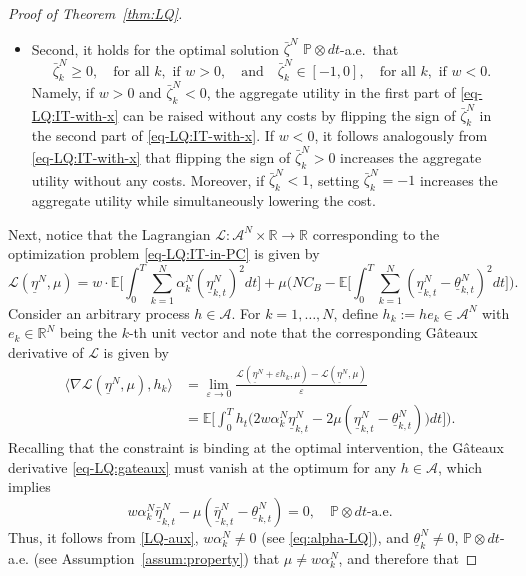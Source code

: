 \documentclass[11pt]{article}
\def\al{\alpha}
\def\P{\mathbb{P}}
\def\E{{\mathbb{E}}}
\newcommand{\R}{{\mathbb R}}
\newcommand{\be}{\begin{equation}}
\newcommand{\ee}{\end{equation}}
\numberwithin{equation}{section}
\begin{document}
\begin{proof}[Proof of Theorem~\ref{thm:LQ}]
\begin{itemize}
\item Second, it holds for the optimal solution $\bar\zeta^N$ $\P \otimes dt$-a.e.~that
\be\label{eq-LQ:optimal-x-constraint}
\bar\zeta^N_{k}\geq 0,\quad  \textrm{for all } k,\textrm{ if }w>0,\quad \textrm{and}\quad \bar\zeta^N_{k}\in [-1,0],\quad  \textrm{for all }k,\textrm{ if }w<0.
\ee
Namely, if $w>0$ and $\bar\zeta^N_k<0$, the aggregate utility in the first part of \eqref{eq-LQ:IT-with-x} can be raised without any costs by flipping the sign of $\bar\zeta^N_k$ in the second part of \eqref{eq-LQ:IT-with-x}. If $w<0$, it follows analogously from \eqref{eq-LQ:IT-with-x} that flipping the sign of $\bar\zeta^N_{k}> 0$ increases the aggregate utility without any costs. Moreover, if $\bar\zeta^N_{k}< 1$, setting $\bar\zeta^N_{k}=-1$ increases the aggregate utility while simultaneously lowering the cost.
\end{itemize}
Next, notice that the Lagrangian $\mathcal{L}:\mathcal{A}^N\times\R\to\R$ corresponding to the optimization problem \eqref{eq-LQ:IT-in-PC} is given by 
$$
\mathcal{L}(\underline{\eta}^N,\mu)=w \cdot\E\bigg[\int_0^T \sum_{k=1}^N\al^N_k(\underline{\eta}_{k,t}^N)^2dt\bigg]
+\mu \bigg(NC_B-\E\bigg[\int_0^T\sum_{k=1}^N ( \underline{\eta}^N_{k,t}-\underline{\theta}^N_{k,t})^2dt\bigg]\bigg).
$$
Consider an arbitrary process $h\in\mathcal{A}$. For $k=1,\ldots,N$, define $h_k:=he_{k}\in\mathcal{A}^N$ with $e_{k}\in\R^N$ being the $k$-th unit vector and note that the corresponding G\^ateaux derivative of $\mathcal{L}$ is given by
\be \begin{aligned}\label{eq-LQ:gateaux}
    \langle  \nabla  \mathcal{L}(\underline{{\eta}}^N,\mu) , h_k  \rangle &= \lim_{\varepsilon \to 0} \frac{ \mathcal{L}(\underline{{\eta}}^N+\varepsilon h_{k},\mu) -  \mathcal{L}(\underline{{\eta}}^N,\mu)}{\varepsilon}\\
    &= \E\bigg[\int_0^T h_t \big(2w\al^N_k\underline{\eta}^N_{k,t}-2\mu( \underline{\eta}^N_{k,t}-\underline{\theta}^N_{k,t})\big)dt\bigg]\bigg).
\end{aligned}\ee
Recalling that the constraint is binding at the optimal intervention, the G\^ateaux derivative \eqref{eq-LQ:gateaux} must vanish at the optimum for any $h\in\mathcal{A}$, which implies 
\be\label{LQ-aux}
w\al^N_k\underline{\bar{\eta}}^N_{k,t}-\mu( \underline{\bar{\eta}}^N_{k,t}-\underline{\theta}^N_{k,t})=0,\quad \P \otimes dt \textrm{-a.e.}
\ee
Thus, it follows from \eqref{LQ-aux}, $w\al^N_k\neq 0$ (see \eqref{eq:alpha-LQ}), and $\underline{\theta}^N_k\neq 0$, $\P \otimes dt$-a.e. (see Assumption~\ref{assum:property}) that $\mu\neq w\al^N_k$, and therefore  that

\end{proof}
\end{document}
